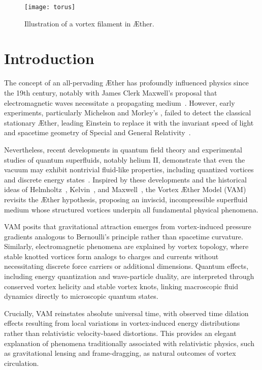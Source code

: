 

\begin{figure}[h]
    \texttt{[image: torus]}
    \caption{Illustration of a vortex filament in Æther.}
    \label{fig:vortex}
\end{figure}


\section*{Introduction}

The concept of an all-pervading Æther has profoundly influenced physics since the 19th century, notably with James Clerk Maxwell's proposal that electromagnetic waves necessitate a propagating medium~\cite{Maxwell1865}. However, early experiments, particularly Michelson and Morley's \cite{michelson1887}, failed to detect the classical stationary Æther, leading Einstein to replace it with the invariant speed of light and spacetime geometry of Special and General Relativity~\cite{einstein1916foundation}.

Nevertheless, recent developments in quantum field theory and experimental studies of quantum superfluids, notably helium II, demonstrate that even the vacuum may exhibit nontrivial fluid-like properties, including quantized vortices and discrete energy states~\cite{Wilczek1999, Donnelly1991quantized}. Inspired by these developments and the historical ideas of Helmholtz~\cite{helmholtz1867integrals}, Kelvin~\cite{kelvin1867vortex}, and Maxwell~\cite{Maxwell1865}, the Vortex Æther Model (VAM) revisits the Æther hypothesis, proposing an inviscid, incompressible superfluid medium whose structured vortices underpin all fundamental physical phenomena.

VAM posits that gravitational attraction emerges from vortex-induced pressure gradients analogous to Bernoulli's principle rather than spacetime curvature. Similarly, electromagnetic phenomena are explained by vortex topology, where stable knotted vortices form analogs to charges and currents without necessitating discrete force carriers or additional dimensions. Quantum effects, including energy quantization and wave-particle duality, are interpreted through conserved vortex helicity and stable vortex knots, linking macroscopic fluid dynamics directly to microscopic quantum states.

Crucially, VAM reinstates absolute universal time, with observed time dilation effects resulting from local variations in vortex-induced energy distributions rather than relativistic velocity-based distortions. This provides an elegant explanation of phenomena traditionally associated with relativistic physics, such as gravitational lensing and frame-dragging, as natural outcomes of vortex circulation.

